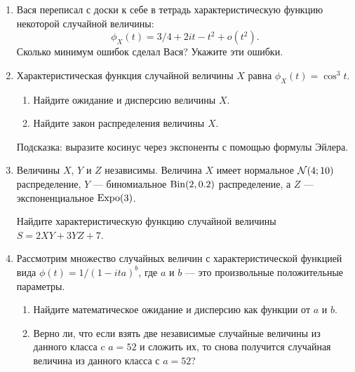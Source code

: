 \begin{enumerate}[resume]

\item Вася переписал с доски к себе в тетрадь характеристическую функцию некоторой случайной величины:
\[
\phi_X(t) = 3/4 + 2it - t^2 + o(t^2). 
\]
Сколько минимум ошибок сделал Вася? Укажите эти ошибки. 


\item Характеристическая функция случайной величины $X$ равна $\phi_X(t) = \cos^3 t$.

\begin{enumerate}
    \item Найдите ожидание и дисперсию величины $X$.
    \item Найдите закон распределения величины $X$.
\end{enumerate}


Подсказка: выразите косинус через экспоненты с помощью формулы Эйлера.


\item Величины $X$, $Y$ и $Z$ независимы. 
Величина $X$ имеет нормальное $\mathcal{N}(4; 10)$ распределение, $Y$ — биномиальное $\mathrm{Bin}(2, 0.2)$ распределение, 
а $Z$ — экспоненциальное $\mathrm{Expo}(3)$.

Найдите характеристическую функцию случайной величины $S = 2XY + 3YZ + 7$.


\item Рассмотрим множество случайных величин с характеристической функцией вида $\phi(t) = 1/(1 - ita)^b$, где $a$ и $b$ — это произвольные положительные параметры.
\begin{enumerate}
    \item Найдите математическое ожидание и дисперсию как функции от $a$ и $b$.
    \item Верно ли, что если взять две независимые случайные величины из данного класса c $a = 52$ и сложить их, то снова получится случайная величина из данного класса с $a = 52$?
\end{enumerate}


\end{enumerate}
